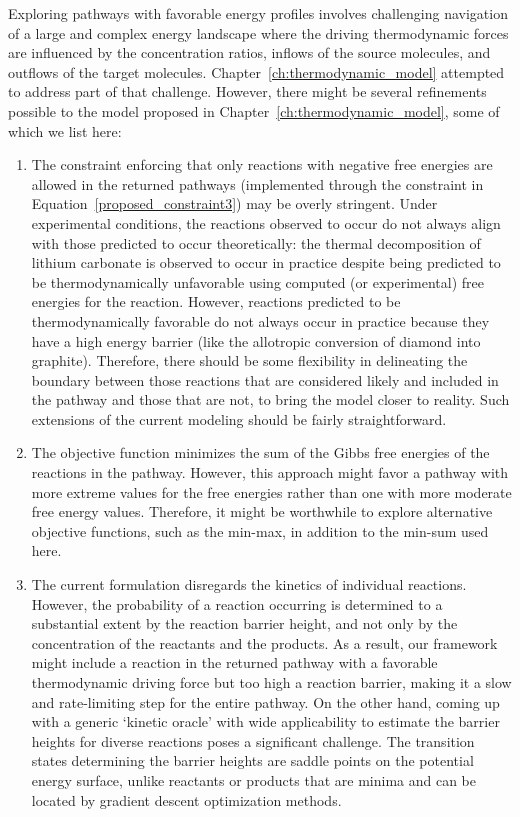 Exploring pathways with favorable energy profiles involves challenging navigation of a large and complex energy landscape where the driving thermodynamic forces are influenced by the concentration ratios, inflows of the source molecules, and outflows of the target molecules.
Chapter~\ref{ch:thermodynamic_model} attempted to address part of that challenge.
However, there might be several refinements possible to the model proposed in Chapter~\ref{ch:thermodynamic_model}, some of which we list here:
\begin{enumerate}
    \item The constraint enforcing that only reactions with negative free energies are allowed in the returned pathways (implemented through the constraint in Equation~\eqref{proposed_constraint3}) may be overly stringent.
    Under experimental conditions, the reactions observed to occur do not always align with those predicted to occur theoretically: the thermal decomposition of lithium carbonate is observed to occur in practice despite being predicted to be thermodynamically unfavorable using computed (or experimental) free energies for the reaction.
    However, reactions predicted to be thermodynamically favorable do not always occur in practice because they have a high energy barrier (like the allotropic conversion of diamond into graphite).
    Therefore, there should be some flexibility in delineating the boundary between those reactions that are considered likely and included in the pathway and those that are not, to bring the model closer to reality. 
    Such extensions of the current modeling should be fairly straightforward.
    \item The objective function minimizes the sum of the Gibbs free energies of the reactions in the pathway.
    However, this approach might favor a pathway with more extreme values for the free energies rather than one with more moderate free energy values.
    Therefore, it might be worthwhile to explore alternative objective functions, such as the min-max, in addition to the min-sum used here.
    \item The current formulation disregards the kinetics of individual reactions.
    However, the probability of a reaction occurring is determined to a substantial extent by the reaction barrier height, and not only by the concentration of the reactants and the products.
    As a result, our framework might include a reaction in the returned pathway with a favorable thermodynamic driving force but too high a reaction barrier, making it a slow and rate-limiting step for the entire pathway.
    On the other hand, coming up with a generic `kinetic oracle' with wide applicability to estimate the barrier heights for diverse reactions poses a significant challenge.
    The transition states determining the barrier heights are saddle points on the potential energy surface, unlike reactants or products that are minima and can be located by gradient descent optimization methods. 
\end{enumerate}

